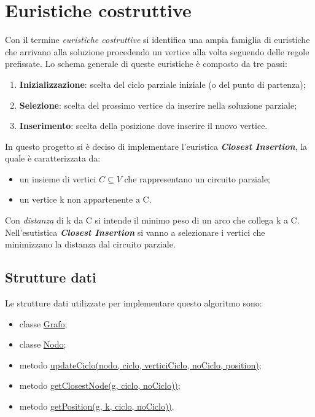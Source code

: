 \section{Euristiche costruttive}
\label{EuristicheCostruttive}

Con il termine \textit{euristiche costruttive} si identifica una ampia famiglia di euristiche che arrivano alla
soluzione procedendo un vertice alla volta seguendo delle regole prefissate. Lo schema generale di
queste euristiche è composto da tre passi:

\begin{enumerate}
    \item \textbf{Inizializzazione}: scelta del ciclo parziale iniziale (o del punto di partenza);
    \item \textbf{Selezione}: scelta del prossimo vertice da inserire nella soluzione parziale;
    \item \textbf{Inserimento}: scelta della posizione dove inserire il nuovo vertice.
\end{enumerate}

In questo progetto si è deciso di implementare l'euristica \textbf{\textit{Closest Insertion}}, la quale è caratterizzata da:

\begin{itemize}
    \item un insieme di vertici $C \subseteq V$ che rappresentano un circuito parziale;
    \item un vertice k non appartenente a C.
\end{itemize}

Con \textit{distanza} di k da C si intende il minimo peso di un arco che collega k a C. Nell'esutistica \textbf{\textit{Closest Insertion}} si vanno a selezionare i vertici che minimizzano la distanza dal circuito parziale.

\subsection{Strutture dati}
\label{struttureDati2}

Le strutture dati utilizzate per implementare questo algoritmo sono:

\begin{itemize}
    \item classe \hyperlink{subsection.2.1}{Grafo};
    \item classe \hyperlink{subsection.2.2}{Nodo};
    \item metodo \hyperlink{updateCiclo}{updateCiclo(nodo, ciclo, verticiCiclo, noCiclo, position)};
    \item metodo \hyperlink{getClosestNode}{getClosestNode(g, ciclo, noCiclo))};
    \item metodo \hyperlink{getPosition}{getPosition(g, k, ciclo, noCiclo))}.
\end{itemize}


